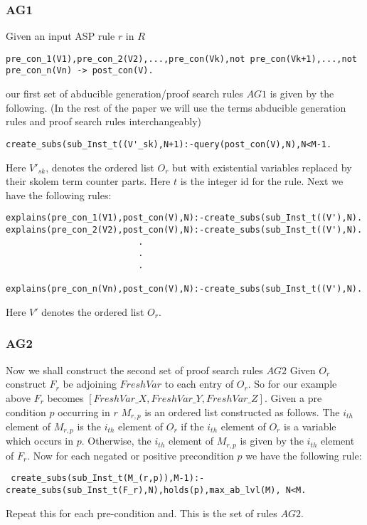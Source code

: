 \documentclass[sigconf]{acmart}
\begin{document}
\subsubsection{AG1}
Given an input ASP rule $r$ in $R$
\begin{verbatim}
pre_con_1(V1),pre_con_2(V2),...,pre_con(Vk),not pre_con(Vk+1),...,not pre_con_n(Vn) -> post_con(V).
\end{verbatim}
our first set of abducible generation/proof search rules $AG1$ is given by the following. (In the rest of the paper we will use the terms abducible generation rules and proof search rules interchangeably) 
\begin{verbatim}
create_subs(sub_Inst_t((V'_sk),N+1):-query(post_con(V),N),N<M-1.
\end{verbatim}
Here $V'_{sk}$, denotes the ordered list $O_{r}$ but with existential variables replaced by their skolem term counter parts. Here $t$ is the integer id for the rule.
Next we have the following rules:
\begin{verbatim}
explains(pre_con_1(V1),post_con(V),N):-create_subs(sub_Inst_t((V'),N).
explains(pre_con_2(V2),post_con(V),N):-create_subs(sub_Inst_t((V'),N).
                          .
                          .
                          .
                        
explains(pre_con_n(Vn),post_con(V),N):-create_subs(sub_Inst_t((V'),N).
\end{verbatim}
Here $V'$ denotes the ordered list $O_{r}$.

\subsubsection{AG2}
Now we shall construct the second set of proof search rules $AG2$ Given $O_{r}$ construct $F_{r}$ be adjoining $FreshVar$ to each entry of $O_{r}$. So for our example above $F_{r}$ becomes $[FreshVar\_X,FreshVar\_Y,FreshVar\_Z]$. Given a pre condition $p$ occurring in $r$ $M_{r,p}$ is an ordered list constructed as follows. The $i_{th}$ element of $M_{r,p}$ is the $i_{th}$ element of $O_{r}$ if the $i_{th}$ element of $O_{r}$ is a variable which occurs in $p$. Otherwise, the $i_{th}$ element of $M_{r,p}$ is given by the $i_{th}$ element of $F_{r}$. Now for each negated or positive precondition $p$ we have the following rule:
\begin{verbatim}
 create_subs(sub_Inst_t(M_(r,p)),M-1):-create_subs(sub_Inst_t(F_r),N),holds(p),max_ab_lvl(M), N<M.   
\end{verbatim}
Repeat this for each pre-condition and. This is the set of rules $AG2$.
\end{document}
